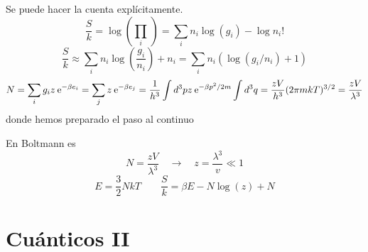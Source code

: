 \documentclass[10pt,oneside]{CBFT_book}
\begin{document}
Se puede hacer la cuenta explícitamente.
\[
	\frac{S}{k} = \log \left( \prod_i \frac{}{} \right) =
	\sum_i n_i \log (g_i) - \log n_i!
\]
\[
	\frac{S}{k} \approx 	\sum_i n_i \log \left(\frac{g_i}{n_i}\right) + n_i =
	\sum_i n_i \left( \log (g_i/n_i) + 1 \right)
\]
\[
	N = \sum_i g_i z \:\mathrm{e}^{-\beta e_i} = \sum_j z\:\mathrm{e}^{-\beta e_j} =
	\frac{1}{h^3} \int d^3p z \:\mathrm{e}^{-\beta p^2 / 2m } \int d^3 q =
	\frac{zV}{h^3} (2\pi m k T)^{3/2} = \frac{zV}{\lambda^3}
\]
donde hemos preparado el paso al continuo

En Boltmann es 
\[
	N = \frac{zV}{\lambda^3} \quad \rightarrow \quad z = \frac{\lambda^3}{v} \ll 1 
\]
\[
	E = \frac{3}{2}NkT \qquad \frac{S}{k} = \beta E - N \log( z ) + N
\]


\section{Cuánticos II}
\end{document}
